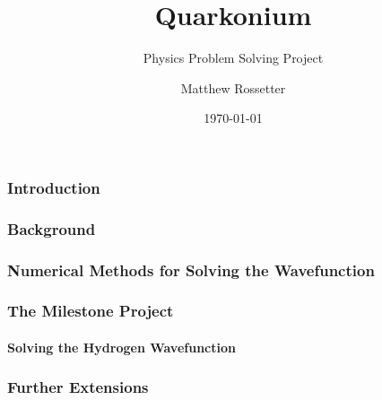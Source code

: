 \documentclass{beamer}
\title{Quarkonium}
\subtitle{Physics Problem Solving Project}
\author{Matthew Rossetter}
\institute{
    Durham University
}
\date{\today}
\begin{document}
\frame{\titlepage}

\begin{frame}
    \frametitle{Introduction}
\end{frame}

\begin{frame}
    \frametitle{Background}
\end{frame}

\begin{frame}
    \frametitle{Numerical Methods for Solving the Wavefunction}
\end{frame}

\begin{frame}
    \frametitle{The Milestone Project}
    \framesubtitle{Solving the Hydrogen Wavefunction}
\end{frame}

\begin{frame}
    \frametitle{Further Extensions}
\end{frame}
\end{document}
